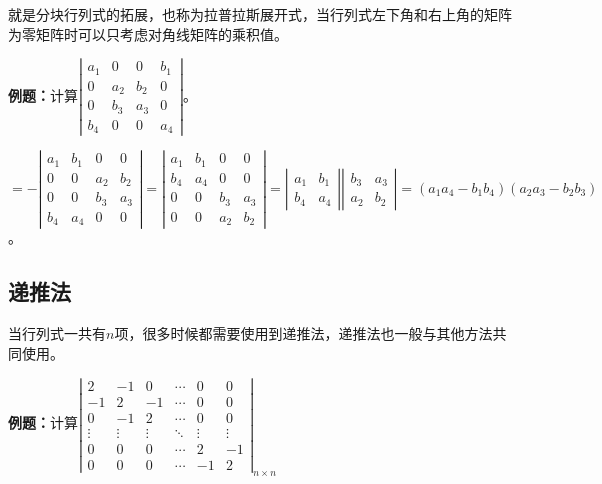 就是分块行列式的拓展，也称为拉普拉斯展开式，当行列式左下角和右上角的矩阵为零矩阵时可以只考虑对角线矩阵的乘积值。

\textbf{例题：}计算$\left|\begin{array}{cccc} 
    a_1 & 0 & 0 & b_1 \\
    0 & a_2 & b_2 & 0 \\
    0 & b_3 & a_3 & 0 \\
    b_4 & 0 & 0 & a_4
\end{array}\right|$。

$=-\left|\begin{array}{cccc} 
    a_1 & b_1 & 0 & 0  \\
    0 & 0 & a_2 & b_2 \\
    0 & 0 & b_3 & a_3 \\
    b_4 & a_4 & 0 & 0
\end{array}\right|=\left|\begin{array}{cccc} 
    a_1 & b_1 & 0 & 0  \\
    b_4 & a_4 & 0 & 0 \\
    0 & 0 & b_3 & a_3 \\
    0 & 0 & a_2 & b_2
\end{array}\right|=\left|\begin{array}{cc} 
    a_1 & b_1 \\
    b_4 & a_4
\end{array}\right|\left|\begin{array}{cc}
    b_3 & a_3 \\
    a_2 & b_2
\end{array}\right|=(a_1a_4-b_1b_4)(a_2a_3-b_2b_3)$。

\subsection{递推法}

当行列式一共有$n$项，很多时候都需要使用到递推法，递推法也一般与其他方法共同使用。

\textbf{例题：}计算$\left|\begin{array}{cccccc} 
    2 & -1 & 0 & \cdots & 0 & 0  \\
    -1 & 2 & -1 & \cdots & 0 & 0 \\
    0 & -1 & 2 & \cdots & 0 & 0 \\
    \vdots & \vdots & \vdots & \ddots & \vdots & \vdots \\
    0 & 0 & 0 & \cdots & 2 & -1 \\
    0 & 0 & 0 & \cdots & -1 & 2
\end{array}\right|_{n\times n}$

